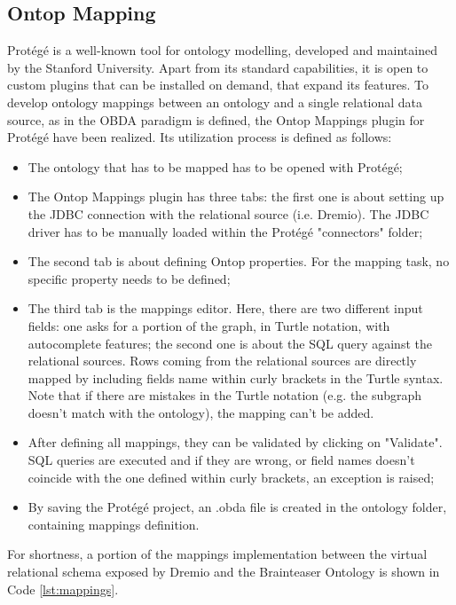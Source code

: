 \subsection{Ontop Mapping}
Protégé is a well-known tool for ontology modelling, developed and maintained by the Stanford University. Apart from its standard capabilities, it is open to custom plugins that can be installed on demand, that expand its features.
To develop ontology mappings between an ontology and a single relational data source, as in the \ac{OBDA} paradigm is defined, the Ontop Mappings plugin for Protégé have been realized. Its utilization process is defined as follows:
\begin{itemize}
  \item The ontology that has to be mapped has to be opened with Protégé;
  \item The Ontop Mappings plugin has three tabs: the first one is about setting up the \ac{JDBC} connection with the relational source (i.e. Dremio). The \ac{JDBC} driver has to be manually loaded within the Protégé "connectors" folder;
  \item The second tab is about defining Ontop properties. For the mapping task, no specific property needs to be defined;
  \item The third tab is the mappings editor. Here, there are two different input fields: one asks for a portion of the graph, in Turtle notation, with autocomplete features; the second one is about the SQL query against the relational sources. Rows coming from the relational sources are directly mapped by including fields name within curly brackets in the Turtle syntax. Note that if there are mistakes in the Turtle notation (e.g. the subgraph doesn't match with the ontology), the mapping can't be added.
  \item After defining all mappings, they can be validated by clicking on "Validate". \ac{SQL} queries are executed and if they are wrong, or field names doesn't coincide with the one defined within curly brackets, an exception is raised;
  \item By saving the Protégé project, an .obda file is created in the ontology folder, containing mappings definition.
\end{itemize}  

For shortness, a portion of the mappings implementation between the virtual relational schema exposed by Dremio and the Brainteaser Ontology is shown in Code \ref{lst:mappings}.

